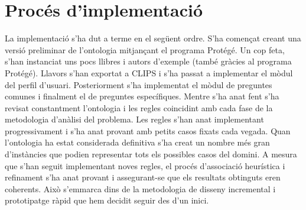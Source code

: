 
\section{Procés d'implementació}

La implementació s'ha dut a terme en el següent ordre. S'ha començat creant una versió preliminar de l'ontologia mitjançant el programa Protégé. Un cop feta, s'han instanciat uns pocs llibres i autors d'exemple (també gràcies al programa Protégé). Llavors s'han exportat a CLIPS i s'ha passat a implementar el mòdul del perfil d'usuari. Posteriorment s'ha implementat el mòdul de preguntes comunes i finalment el de preguntes específiques. Mentre s'ha anat fent s'ha revisat constantment l'ontologia i les regles coincidint amb cada fase de la metodologia d'anàlisi del problema. Les regles s'han anat implementant progressivament i s'ha anat provant amb petits casos fixats cada vegada. Quan l'ontologia ha estat considerada definitiva s'ha creat un nombre més gran d'instàncies que podien representar tots els possibles casos del domini. A mesura que s'han seguit implementant noves regles, el procés d'associació heurística i refinament s'ha anat provant i assegurant-se que els resultats obtinguts eren coherents. Això s'emmarca dins de la metodologia de disseny incremental i prototipatge ràpid que hem decidit seguir des d'un inici.